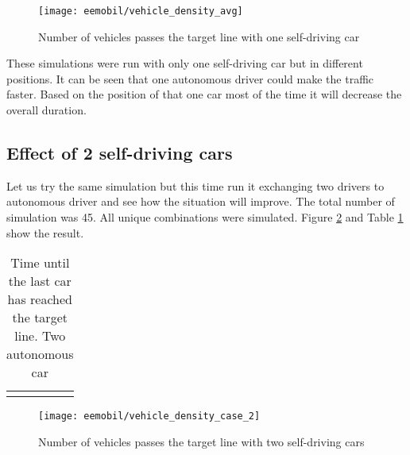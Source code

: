 		\begin{figure}[ht]
			\centering
			\texttt{[image: eemobil/vehicle\_density\_avg]}
			\caption{Number of vehicles passes the target line with one self-driving car}
			\label{fig:vehicle_density_avg}
		\end{figure}
		
		These simulations were run with only one self-driving car but in different positions. It can be seen that one autonomous driver could make the traffic faster. Based on the position of that one car most of the time it will decrease the overall duration.
		\subsection{Effect of 2 self-driving cars}
		Let us try the same simulation but this time run it exchanging two drivers to autonomous driver and see how the situation will improve. The total number of simulation was 45. All unique combinations were simulated. Figure \ref{fig:vehicle_density_case_2} and Table \ref{tab:vehicle_density_minmaxavg_case2} show the result.
		\begin{table}[ht]
			\begin{center}
				\begin{tabular}{ |c|c|c|c|}
					\hline
					\vehicledensitytable{2}
					\hline
				\end{tabular}
			\end{center}
			\caption{Time until the last car has reached the target line. Two autonomous car}
			\label{tab:vehicle_density_minmaxavg_case2}
		\end{table}
		\begin{figure}[ht]
			\centering
			\texttt{[image: eemobil/vehicle\_density\_case\_2]}
			\caption{Number of vehicles passes the target line with two self-driving cars}
			\label{fig:vehicle_density_case_2}
		\end{figure}

